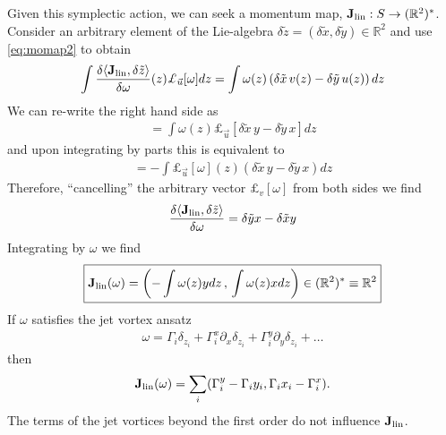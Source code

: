 \documentclass[12pt]{amsart}
\theoremstyle{remark}
\begin{document}
Given this symplectic action, we can seek a momentum map, ${\bf J}_{\rm lin}:S \to (\mathbb{R}^2)^*$.  Consider an arbitrary element of the Lie-algebra $\delta \tilde{z}  = (\delta \tilde{x}, \delta \tilde{y}) \in \mathbb{R}^2$ and use \eqref{eq:momap2} to obtain
\begin{align*}
  \int \frac{\delta \langle {\bf J}_{\rm lin} , \delta \tilde{z} \rangle}{\delta \omega}(z)   \pounds_{\vec{u}}[\omega] dz
  = \int \omega(z) \left( \delta \tilde{x} \, v(z) - \delta \tilde{y} \, u(z) \right) dz
\end{align*}
We can re-write the right hand side as
\begin{align*}
  = \int \omega(z)  \pounds_{\vec{u}} [ \delta \tilde{x} \, y - \delta \tilde{y} \, x] dz
\end{align*}
and upon integrating by parts this is equivalent to
\begin{align*}
  = - \int \pounds_{\vec{u}}[\omega](z)  \left( \delta \tilde{x}\, y - \delta \tilde{y}\, x \right) dz
\end{align*}
Therefore, ``cancelling'' the arbitrary vector $\pounds_v[\omega]$ from both sides we find
\begin{align*}
  \frac{\delta  \langle {\bf J}_{\rm lin} , \delta \tilde{z} \rangle}{\delta \omega} = \delta \tilde{y} x - \delta \tilde{x} y
\end{align*}
Integrating by $\omega$ we find
\begin{align*}
  \boxed{
    {\bf J}_{\rm lin}(\omega) = \left( -\int \omega(z) y dz \, , \, \int \omega(z) x dz \right) \in (\mathbb{R}^2)^* \equiv \mathbb{R}^2}
\end{align*}
If $\omega$ satisfies the jet vortex ansatz
\begin{align*}
  \omega = \Gamma_i \delta_{z_i} + \Gamma_i^x \partial_x \delta_{z_i} + \Gamma_i^y \partial_y \delta_{z_i} + \dots
\end{align*}
then
\begin{align*}
  {\bf J}_{\rm lin}(\omega) = \sum_i ( \Gamma_i^{y} - \Gamma_i y_i , \Gamma_i x_i -\Gamma_i^{x} ).
\end{align*}
The terms of the jet vortices beyond the first order do not influence ${\bf J}_{\rm lin}$.
\end{document}
